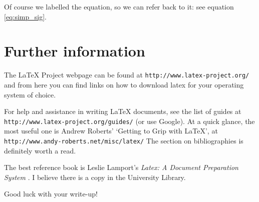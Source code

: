 Of course we labelled the equation, so we can refer back to it: see equation
\ref{eq:simp_sig}.

	\section{Further information}

The \LaTeX{} Project webpage can be found at
\texttt{http://www.latex-project.org/} and from here you can find links
on how to download latex for your operating system of choice.

For help and assistance in writing \LaTeX{} documents, see the list of
guides at \\
\texttt{http://www.latex-project.org/guides/} (or use Google).
At a quick glance, the most useful one is Andrew Roberts' `Getting to
Grip with \LaTeX{}', at \texttt{http://www.andy-roberts.net/misc/latex/} The
section on bibliographies is definitely worth a read.

The best reference book is Leslie Lamport's
\emph{Latex: A Document Preparation System} \cite{lamport94}.
I believe there is a copy in the University Library.

Good luck with your write-up!



